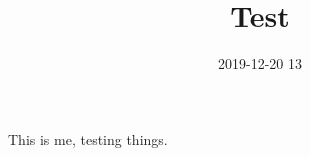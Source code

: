 \documentclass[a4paper]{article}
\title{ Test }
\date{ 2019-12-20 13 }
\begin{document}
    \maketitle

    This is me, testing things.
\end{document}
